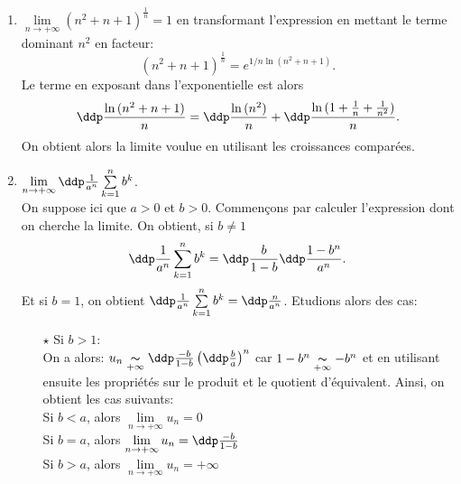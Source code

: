\begin{correction}
\begin{enumerate}
\item
$\lim \limits_{n\to +\infty}(n^2+n+1)^{\frac{1}{n}}=1$ en transformant l'expression en mettant le terme dominant $n^2$ en facteur:
$$(n^2+n+1)^{\frac{1}{n}}=e^{1/n\ln{(n^2+n+1)}}.$$
Le terme en exposant dans l'exponentielle est alors
$$\ddp\frac{\ln{(n^2+n+1)}}{n}=\ddp\frac{\ln{(n^2)}}{n}+\ddp\frac{\ln{(1+\frac{1}{n}+\frac{1}{n^2})}}{n}.$$
On obtient alors la limite voulue en utilisant les croissances compar\'ees.
\item
$\lim \limits_{n\to +\infty}\ddp\frac{1}{a^n}\sum\limits_{k=1}^n b^k$.\\
\noindent On suppose ici que $a>0$ et $b>0$. Commen\c{c}ons par calculer l'expression dont on cherche la limite. On obtient, si $b\not= 1$
$$\ddp\frac{1}{a^n}\sum\limits_{k=1}^n b^k=\ddp\frac{b}{1-b}\ddp\frac{1-b^n}{a^n}.$$
Et si $b=1$, on obtient $\ddp\frac{1}{a^n}\sum\limits_{k=1}^n b^k=\ddp\frac{n}{a^n}$.
Etudions alors des cas:
\begin{itemize}
\item[$\star$] Si $b>1$:\\
\noindent On a alors: $u_n\underset{+\infty}{\thicksim} \ddp\frac{-b}{1-b} \left( \ddp\frac{b}{a} \right)^n$ car $1-b^n\underset{+\infty}{\thicksim} -b^n$ et en utilisant ensuite les propri\'et\'es sur le produit et le quotient d'\'equivalent.
Ainsi, on obtient les cas suivants:\\
\noindent Si $b<a$, alors $\lim\limits_{n\to +\infty} u_n=0$\\
\noindent Si $b=a$, alors $\lim\limits_{n\to +\infty} u_n=\ddp\frac{-b}{1-b}$\\
\noindent Si $b>a$, alors $\lim\limits_{n\to +\infty} u_n=+\infty$\\

\end{itemize}
\end{enumerate}
\end{correction}
